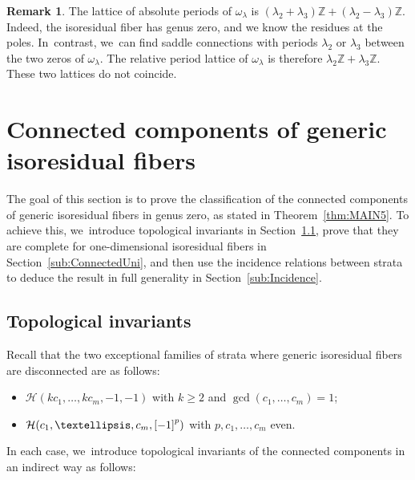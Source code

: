 \documentclass[11pt]{article}
\theoremstyle{definition}
\newtheorem{rmk}[thm]{Remark}
\begin{document}
\begin{rmk}
The lattice of absolute periods of $\omega_{\lambda}$ is $(\lambda_{2}+\lambda_{3})\mathbb{Z}+(\lambda_{2}-\lambda_{3})\mathbb{Z}$. Indeed, the isoresidual fiber has genus zero, and we know the residues at the poles. In~contrast, we~can find saddle connections with periods $\lambda_{2}$ or $\lambda_{3}$ between the two zeros of $\omega_{\lambda}$. The relative period lattice of $\omega_{\lambda}$ is therefore $\lambda_{2}\mathbb{Z}+\lambda_{3}\mathbb{Z}$. These two lattices do not coincide.
\end{rmk}

\section{Connected components of generic isoresidual fibers}\label{sec:Connected}

The goal of this section is to prove the classification of the connected components of generic isoresidual fibers in genus zero, as stated in Theorem~\ref{thm:MAIN5}. To achieve this, we~introduce topological invariants in Section~\ref{sub:ConnectedInvariant}, prove that they are complete for one-dimensional isoresidual fibers in Section~\ref{sub:ConnectedUni}, and then use the incidence relations between strata to deduce the result in full generality in Section~\ref{sub:Incidence}.

\subsection{Topological invariants}\label{sub:ConnectedInvariant}

Recall that the two exceptional families of strata where generic isoresidual fibers are disconnected are as follows:
\begin{itemize}
\item $\mathcal{H}(kc_{1},\dots,kc_{m},-1,-1)$ with $k \geq 2$ and $\gcd(c_{1},\dots,c_{m})=1$;
\item $\mathcal{H}(c_{1},\dots,c_{m},\rec[-1][p])$ with $p,c_{1},\dots,c_{m}$ even.
\end{itemize}
In each case, we~introduce topological invariants of the connected components in an indirect way as follows:
\end{document}

